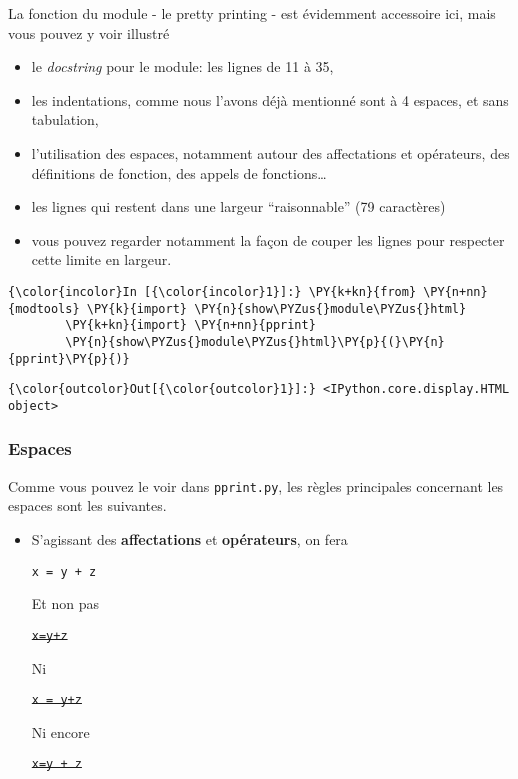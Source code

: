 La fonction du module - le pretty printing - est évidemment accessoire
ici, mais vous pouvez y voir illustré

\begin{itemize}
\tightlist
\item
  le \emph{docstring} pour le module: les lignes de 11 à 35,
\item
  les indentations, comme nous l'avons déjà mentionné sont à 4 espaces,
  et sans tabulation,
\item
  l'utilisation des espaces, notamment autour des affectations et
  opérateurs, des définitions de fonction, des appels de
  fonctions\ldots{}
\item
  les lignes qui restent dans une largeur ``raisonnable'' (79
  caractères)
\item
  vous pouvez regarder notamment la façon de couper les lignes pour
  respecter cette limite en largeur.
\end{itemize}

    \begin{Verbatim}[commandchars=\\\{\}]
{\color{incolor}In [{\color{incolor}1}]:} \PY{k+kn}{from} \PY{n+nn}{modtools} \PY{k}{import} \PY{n}{show\PYZus{}module\PYZus{}html}
        \PY{k+kn}{import} \PY{n+nn}{pprint}
        \PY{n}{show\PYZus{}module\PYZus{}html}\PY{p}{(}\PY{n}{pprint}\PY{p}{)}
\end{Verbatim}


\begin{Verbatim}[commandchars=\\\{\}]
{\color{outcolor}Out[{\color{outcolor}1}]:} <IPython.core.display.HTML object>
\end{Verbatim}
            
    \hypertarget{espaces}{%
\subsubsection{Espaces}\label{espaces}}

    Comme vous pouvez le voir dans \texttt{pprint.py}, les règles
principales concernant les espaces sont les suivantes.

    \begin{itemize}
\item
  S'agissant des \textbf{affectations} et \textbf{opérateurs}, on fera

  \texttt{x\ =\ y\ +\ z}

  Et non pas

  \sout{\texttt{x=y+z}}

  Ni

  \sout{\texttt{x\ =\ y+z}}

  Ni encore

  \sout{\texttt{x=y\ +\ z}}
\end{itemize}

